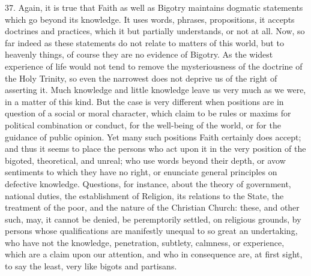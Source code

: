 37. Again, it is true that Faith as well as Bigotry maintains
dogmatic statements which go beyond its knowledge. It uses words,
phrases, propositions, it accepts doctrines and practices, which it
but partially understands, or not at all. Now, so far indeed as these
statements do not relate to matters of this world, but to heavenly
things, of course they are no evidence of Bigotry. As the widest
experience of life would not tend to remove the mysteriousness of the
doctrine of the Holy Trinity, so even the narrowest does not deprive
us of the right of asserting it. Much knowledge and little knowledge
leave us very much as we were, in a matter of this kind. But the case
is very different when positions are in question of a social or moral
character, which claim to be rules or maxims for political combination
or conduct, for the well-being of the world, or for the guidance of
public opinion. Yet many such positions Faith certainly does accept;
and thus it seems to place the persons who act upon it in the very
position of the bigoted, theoretical, and unreal; who use words beyond
their depth, or avow sentiments to which they have no right, or
enunciate general principles on defective knowledge. Questions, for
instance, about the theory of government, national duties, the
establishment of Religion, its relations to the State, the treatment
of the poor, and the nature of the Christian Church: these, and other
such, may, it cannot be denied, be peremptorily settled, on religious
grounds, by persons whose qualifications are manifestly unequal to so
great an undertaking, who have not the knowledge, penetration,
subtlety, calmness, or experience, which are a claim upon our
attention, and who in consequence are, at first sight, to say the
least, very like bigots and partisans.

